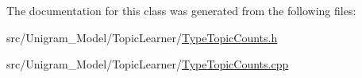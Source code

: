 The documentation for this class was generated from the following files:\begin{DoxyCompactItemize}
\item 
src/Unigram\_\-Model/TopicLearner/\hyperlink{_type_topic_counts_8h}{TypeTopicCounts.h}\item 
src/Unigram\_\-Model/TopicLearner/\hyperlink{_type_topic_counts_8cpp}{TypeTopicCounts.cpp}\end{DoxyCompactItemize}
